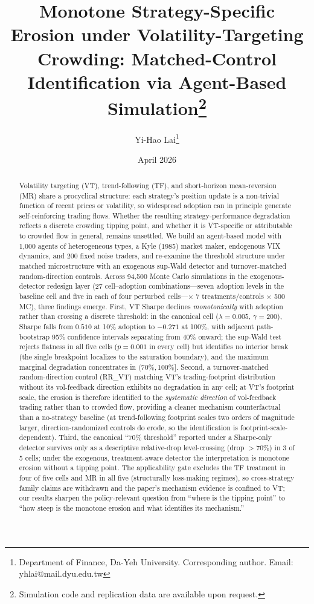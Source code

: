 \documentclass[12pt,a4paper]{article}
\title{Monotone Strategy-Specific Erosion under Volatility-Targeting Crowding: Matched-Control Identification via Agent-Based Simulation\thanks{Simulation code and replication data are available upon request.}}
\author{Yi-Hao Lai\thanks{Department of Finance, Da-Yeh University. Corresponding author. Email: yhlai@mail.dyu.edu.tw}}
\date{April 2026}
\begin{document}
\maketitle

\begin{abstract}
\noindent
Volatility targeting (VT), trend-following (TF), and short-horizon mean-reversion (MR) share a procyclical structure: each strategy's position update is a non-trivial function of recent prices or volatility, so widespread adoption can in principle generate self-reinforcing trading flows. Whether the resulting strategy-performance degradation reflects a discrete crowding tipping point, and whether it is VT-specific or attributable to crowded flow in general, remains unsettled. We build an agent-based model with 1{,}000 agents of heterogeneous types, a Kyle (1985) market maker, endogenous VIX dynamics, and 200 fixed noise traders, and re-examine the threshold structure under matched microstructure with an exogenous sup-Wald detector and turnover-matched random-direction controls. Across 94{,}500 Monte Carlo simulations in the exogenous-detector redesign layer (27 cell--adoption combinations---seven adoption levels in the baseline cell and five in each of four perturbed cells---$\times$ 7 treatments/controls $\times$ 500 MC), three findings emerge. First, VT Sharpe declines \emph{monotonically} with adoption rather than crossing a discrete threshold: in the canonical cell ($\lambda = 0.005$, $\gamma = 200$), Sharpe falls from $0.510$ at 10\% adoption to $-0.271$ at 100\%, with adjacent path-bootstrap 95\% confidence intervals separating from 40\% onward; the sup-Wald test rejects flatness in all five cells ($p = 0.001$ in every cell) but identifies no interior break (the single breakpoint localizes to the saturation boundary), and the maximum marginal degradation concentrates in $(70\%, 100\%]$. Second, a turnover-matched random-direction control (RR\_VT) matching VT's trading-footprint distribution without its vol-feedback direction exhibits no degradation in any cell; at VT's footprint scale, the erosion is therefore identified to the \emph{systematic direction} of vol-feedback trading rather than to crowded flow, providing a cleaner mechanism counterfactual than a no-strategy baseline (at trend-following footprint scales two orders of magnitude larger, direction-randomized controls do erode, so the identification is footprint-scale-dependent). Third, the canonical ``70\% threshold'' reported under a Sharpe-only detector survives only as a descriptive relative-drop level-crossing (drop $>70\%$) in 3 of 5 cells; under the exogenous, treatment-aware detector the interpretation is monotone erosion without a tipping point. The applicability gate excludes the TF treatment in four of five cells and MR in all five (structurally loss-making regimes), so cross-strategy family claims are withdrawn and the paper's mechanism evidence is confined to VT; our results sharpen the policy-relevant question from ``where is the tipping point'' to ``how steep is the monotone erosion and what identifies its mechanism.''


\end{abstract}
\end{document}
